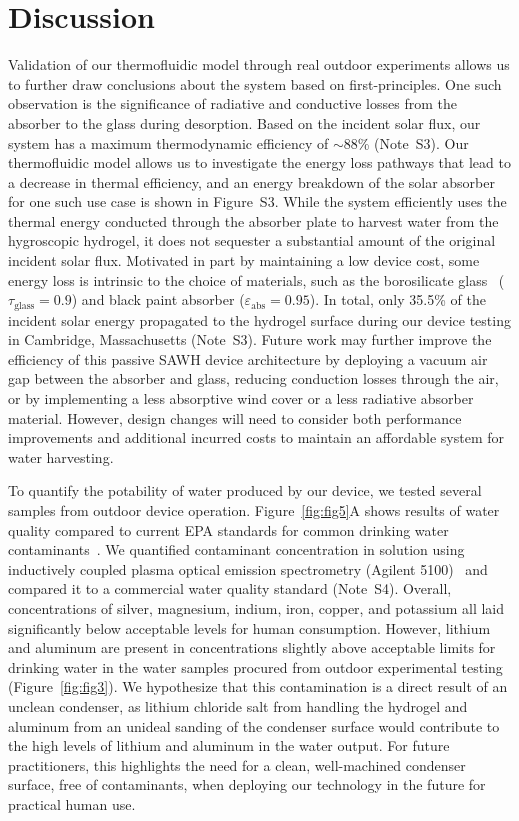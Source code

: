 \documentclass[11pt]{article}
\begin{document}
\section{Discussion}

Validation of our thermofluidic model through real outdoor experiments allows us to further draw conclusions about the system based on first-principles. One such observation is the significance of radiative and conductive losses from the absorber to the glass during desorption. Based on the incident solar flux, our system has a maximum thermodynamic efficiency of $\sim$88\% (Note~S3). Our thermofluidic model allows us to investigate the energy loss pathways that lead to a decrease in thermal efficiency, and an energy breakdown of the solar absorber for one such use case is shown in Figure~S3. While the system efficiently uses the thermal energy conducted through the absorber plate to harvest water from the hygroscopic hydrogel, it does not sequester a substantial amount of the original incident solar flux. Motivated in part by maintaining a low device cost, some energy loss is intrinsic to the choice of materials, such as the borosilicate glass~\cite{bassarab2023} ($\tau_{\mathrm{glass}} = 0.9$) and black paint absorber ($\varepsilon_{\mathrm{abs}} = 0.95$). In total, only 35.5\% of the incident solar energy propagated to the hydrogel surface during our device testing in Cambridge, Massachusetts (Note~S3). Future work may further improve the efficiency of this passive SAWH device architecture by deploying a vacuum air gap between the absorber and glass, reducing conduction losses through the air, or by implementing a less absorptive wind cover or a less radiative absorber material. However, design changes will need to consider both performance improvements and additional incurred costs to maintain an affordable system for water harvesting.

To quantify the potability of water produced by our device, we tested several samples from outdoor device operation. Figure~\ref{fig:fig5}A shows results of water quality compared to current EPA standards for common drinking water contaminants~\cite{epa2023}. We quantified contaminant concentration in solution using inductively coupled plasma optical emission spectrometry (Agilent 5100)~\cite{wilschefski2019} and compared it to a commercial water quality standard (Note~S4). Overall, concentrations of silver, magnesium, indium, iron, copper, and potassium all laid significantly below acceptable levels for human consumption. However, lithium and aluminum are present in concentrations slightly above acceptable limits for drinking water in the water samples procured from outdoor experimental testing (Figure~\ref{fig:fig3}). We hypothesize that this contamination is a direct result of an unclean condenser, as lithium chloride salt from handling the hydrogel and aluminum from an unideal sanding of the condenser surface would contribute to the high levels of lithium and aluminum in the water output. For future practitioners, this highlights the need for a clean, well-machined condenser surface, free of contaminants, when deploying our technology in the future for practical human use.
\end{document}
